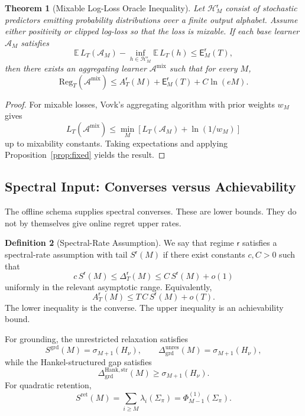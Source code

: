 \documentclass[12pt]{article}
\newtheorem{theorem}{Theorem}[section]
\theoremstyle{definition}
\newtheorem{definition}[theorem]{Definition}
\newcommand{\Hcal}{\mathcal H}
\newcommand{\Dunres}{\Delta_{\mathrm{grd}}^{\mathrm{unres}}}
\newcommand{\DHankstr}{\Delta_{\mathrm{grd}}^{\mathrm{Hank,str}}}
\newcommand{\Reg}{\mathrm{Reg}}
\newcommand{\Est}{\mathsf E}
\newcommand{\Aapp}{A_T}
\begin{document}
\begin{theorem}[Mixable Log-Loss Oracle Inequality]
\label{thm:oracle-logloss}
Let $\Hcal_M^{\mathsf r}$ consist of stochastic predictors emitting
probability distributions over a finite output alphabet.  Assume either
positivity or clipped log-loss so that the loss is mixable.  If each base
learner $\mathcal A_M$ satisfies
\[
\mathbb E\,L_T(\mathcal A_M)
-
\inf_{h\in\Hcal_M^{\mathsf r}}
\mathbb E\,L_T(h)
\le
\Est_M^{\mathsf r}(T),
\]
then there exists an aggregating learner $\mathcal A^{\mathrm{mix}}$ such that
for every $M$,
\[
\Reg_T(\mathcal A^{\mathrm{mix}})
\le
\Aapp^{\mathsf r}(M)
+
\Est_M^{\mathsf r}(T)
+
C\ln(eM).
\]
\end{theorem}

\begin{proof}
For mixable losses, Vovk's aggregating algorithm \cite{vovk1990} with prior weights $w_M$ gives
\[
L_T(\mathcal A^{\mathrm{mix}})
\le
\min_M
\left[
L_T(\mathcal A_M)+\ln(1/w_M)
\right]
\]
up to mixability constants.  Taking expectations and applying
Proposition~\ref{prop:fixed} yields the result.
\end{proof}

\subsection{Spectral Input: Converses versus Achievability}
\label{subsec:oracle-spectral}

The offline schema supplies spectral converses.  These are lower bounds.  They
do not by themselves give online regret upper rates.

\begin{definition}[Spectral-Rate Assumption]
\label{def:spectral-rate}
We say that regime $\mathsf r$ satisfies a spectral-rate assumption with tail
$S^{\mathsf r}(M)$ if there exist constants $c,C>0$ such that
\[
c\,S^{\mathsf r}(M)
\le
\Delta_T^{\mathsf r}(M)
\le
C\,S^{\mathsf r}(M)+o(1)
\]
uniformly in the relevant asymptotic range.  Equivalently,
\[
\Aapp^{\mathsf r}(M)
\le
T\,C\,S^{\mathsf r}(M)+o(T).
\]
The lower inequality is the converse.  The upper inequality is an
achievability bound.
\end{definition}

For grounding, the unrestricted relaxation satisfies
\[
S^{\mathrm{grd}}(M)
=
\sigma_{M+1}(H_\nu),
\qquad
\Dunres(M)
=
\sigma_{M+1}(H_\nu),
\]
while the Hankel-structured gap satisfies
\[
\DHankstr(M)
\ge
\sigma_{M+1}(H_\nu).
\]
For quadratic retention,
\[
S^{\mathrm{ret}}(M)
=
\sum_{i\ge M}\lambda_i(\Sigma_\pi)
=
\Phi^{(1)}_{M-1}(\Sigma_\pi).
\]
\end{document}
